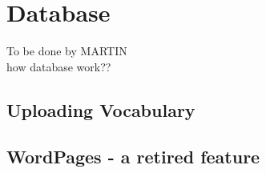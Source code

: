 \section{Database}
To be done by MARTIN \\
how database work??
\subsection{Uploading Vocabulary}
\subsection{WordPages - a retired feature}
